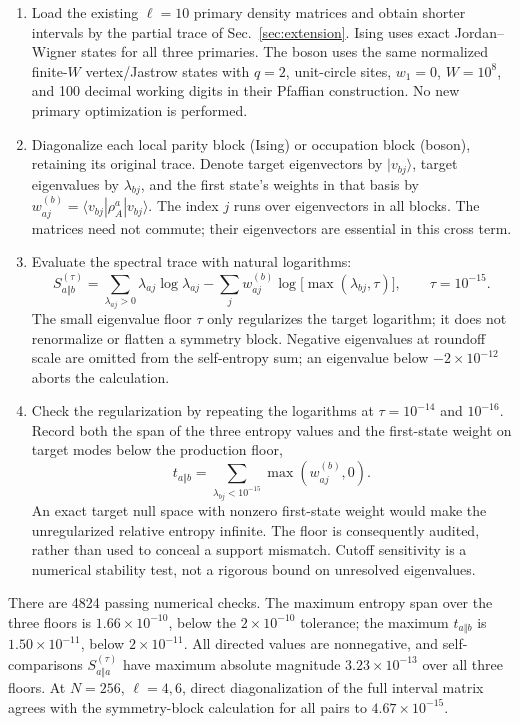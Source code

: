 \begin{enumerate}
\item Load the existing $\ell=10$ primary density matrices and obtain
shorter intervals by the partial trace of Sec.~\ref{sec:extension}.
Ising uses exact Jordan--Wigner states for all three primaries. The
boson uses the same normalized finite-$W$ vertex/Jastrow states with
$q=2$, unit-circle sites, $w_1=0$, $W=10^8$, and 100 decimal working
digits in their Pfaffian construction. No new primary optimization is
performed.
\item Diagonalize each local parity block (Ising) or occupation block
(boson), retaining its original trace. Denote target eigenvectors by
$|v_{bj}\rangle$, target eigenvalues by $\lambda_{bj}$, and the
first state's weights in that basis by
$w_{aj}^{(b)}=\langle v_{bj}|\rho_A^a|v_{bj}\rangle$.
The index $j$ runs over eigenvectors in all blocks. The matrices need
not commute; their eigenvectors are essential in this cross term.
\item Evaluate the spectral trace with natural logarithms:
\begin{equation}
 S^{(\tau)}_{a\Vert b}
 =\sum_{\lambda_{aj}>0}\lambda_{aj}\log\lambda_{aj}
 -\sum_j w_{aj}^{(b)}\log\!\bigl[\max(\lambda_{bj},\tau)\bigr],
 \qquad \tau=10^{-15}.
 \label{eq:primary-numerical-trace}
\end{equation}
The small eigenvalue floor $\tau$ only regularizes the target logarithm;
it does not renormalize or flatten a symmetry block. Negative
eigenvalues at roundoff scale are omitted from the self-entropy sum;
an eigenvalue below $-2\times10^{-12}$ aborts the calculation.
\item Check the regularization by repeating the logarithms at
$\tau=10^{-14}$ and $10^{-16}$. Record both the span of the three
entropy values and the first-state weight on target modes below the
production floor,
\begin{equation}
 t_{a\Vert b}=\sum_{\lambda_{bj}<10^{-15}}
 \max(w_{aj}^{(b)},0).
 \label{eq:primary-tail}
\end{equation}
An exact target null space with nonzero first-state weight would make
the unregularized relative entropy infinite. The floor is consequently
audited, rather than used to conceal a support mismatch. Cutoff
sensitivity is a numerical stability test, not a rigorous bound on
unresolved eigenvalues.
\end{enumerate}

There are 4824 passing numerical checks. The maximum entropy span over
the three floors is $1.66\times10^{-10}$, below the
$2\times10^{-10}$ tolerance; the maximum $t_{a\Vert b}$ is
$1.50\times10^{-11}$, below $2\times10^{-11}$.
All directed values are nonnegative, and self-comparisons
$S^{(\tau)}_{a\Vert a}$ have maximum absolute magnitude
$3.23\times10^{-13}$ over all three floors.
At $N=256$, $\ell=4,6$, direct diagonalization of the full interval
matrix agrees with the symmetry-block calculation for all pairs to
$4.67\times10^{-15}$.

